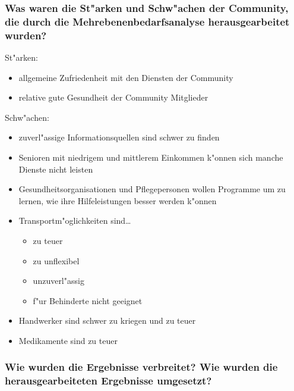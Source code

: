 \subsubsection{Was waren die St"arken und Schw"achen der Community, die durch die Mehrebenenbedarfsanalyse herausgearbeitet wurden?}
St"arken:
\begin{itemize}
        \item allgemeine Zufriedenheit mit den Diensten der Community
        \item relative gute Gesundheit der Community Mitglieder
\end{itemize}

Schw"achen:
\begin{itemize}
        \item zuverl"assige Informationsquellen sind schwer zu finden
        \item Senioren mit niedrigem und mittlerem Einkommen k"onnen sich manche Dienste nicht leisten
        \item Gesundheitsorganisationen und Pflegepersonen wollen Programme um zu lernen, wie ihre Hilfeleistungen besser werden k"onnen
        \item Transportm"oglichkeiten sind\ldots
                \begin{itemize}
                        \item zu teuer
                        \item zu unflexibel
                        \item unzuverl"assig
                        \item f"ur Behinderte nicht geeignet
                \end{itemize}
        \item Handwerker sind schwer zu kriegen und zu teuer
        \item Medikamente sind zu teuer
\end{itemize}

\subsubsection{Wie wurden die Ergebnisse verbreitet? Wie wurden die herausgearbeiteten Ergebnisse umgesetzt?}

